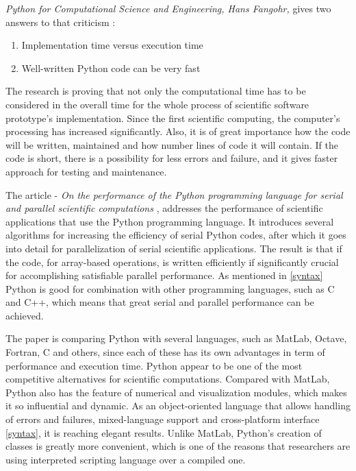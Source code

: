 \documentclass{article}
\begin{document}
\textit{Python for Computational Science and Engineering, Hans Fangohr,} gives two answers to that criticism \cite{HansPython}:
\begin{enumerate}
\item Implementation time versus execution time
\item Well-written Python code can be very fast
\end{enumerate}

The research is proving that not only the computational time has to be considered in the overall time for the whole process of scientific software prototype's implementation. Since the first scientific computing, the computer's processing has increased significantly. Also, it is of great importance how the code will be written, maintained and how number lines of code it will contain. If the code is short, there is a possibility for less errors and failure, and it gives faster approach for testing and maintenance. 

The article - \textit{On the performance of the Python programming language for serial and parallel scientific computations} \cite{cai2005performance}, addresses the performance of scientific applications that use the Python programming language. It introduces several algorithms for increasing the efficiency of serial Python codes, after which it goes into detail for parallelization of serial scientific applications. The result is that if the code, for array-based operations, is written efficiently if significantly crucial for accomplishing satisfiable parallel performance. As mentioned in \ref{syntax} Python is good for combination with other programming languages, such as C and C++, which means that great serial and parallel performance can be achieved. 

The paper \cite{cai2005performance} is comparing Python with several languages, such as MatLab, Octave, Fortran, C and others, since each of these has its own advantages in term of performance and execution time. Python appear to be one of the most competitive alternatives for scientific computations. Compared with MatLab, Python also has the feature of numerical and visualization modules, which makes it so influential and dynamic. As an object-oriented language that allows handling of errors and failures, mixed-language support and cross-platform interface \ref{syntax}, it is reaching elegant results. Unlike MatLab, Python's creation of classes is greatly more convenient, which is one of the reasons that researchers are using interpreted scripting language over a compiled one.
\end{document}
